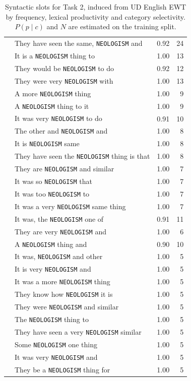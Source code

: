 \begin{table}[t]
\begin{tabular}{llrr}
 & They have seen the same, \texttt{NEOLOGISM} and & 0.92 & 24 \\
 & It is a \texttt{NEOLOGISM} thing to & 1.00 & 13 \\
 & They would be \texttt{NEOLOGISM} to do & 0.92 & 12 \\
 & They were very \texttt{NEOLOGISM} with & 1.00 & 13 \\
 & A more \texttt{NEOLOGISM} thing & 1.00 & 9 \\
 & A \texttt{NEOLOGISM} thing to it & 1.00 & 9 \\
 & It was very \texttt{NEOLOGISM} to do & 0.91 & 10 \\
 & The other and \texttt{NEOLOGISM} and & 1.00 & 8 \\
 & It is \texttt{NEOLOGISM} same & 1.00 & 8 \\
 & They have seen the \texttt{NEOLOGISM} thing is that & 1.00 & 8 \\
 & They are \texttt{NEOLOGISM} and similar & 1.00 & 7 \\
 & It was so \texttt{NEOLOGISM} that & 1.00 & 7 \\
 & It was too \texttt{NEOLOGISM} to & 1.00 & 7 \\
 & It was a very \texttt{NEOLOGISM} same thing & 1.00 & 7 \\
 & It was, the \texttt{NEOLOGISM} one of & 0.91 & 11 \\
 & They are very \texttt{NEOLOGISM} and & 1.00 & 6 \\
 & A \texttt{NEOLOGISM} thing and & 0.90 & 10 \\
 & It was, \texttt{NEOLOGISM} and other & 1.00 & 5 \\
 & It is very \texttt{NEOLOGISM} and & 1.00 & 5 \\
 & It was a more \texttt{NEOLOGISM} thing & 1.00 & 5 \\
 & They know how \texttt{NEOLOGISM} it is & 1.00 & 5 \\
 & They were \texttt{NEOLOGISM} and similar & 1.00 & 5 \\
 & The \texttt{NEOLOGISM} thing to & 1.00 & 5 \\
 & They have seen a very \texttt{NEOLOGISM} similar & 1.00 & 5 \\
 & Some \texttt{NEOLOGISM} one thing & 1.00 & 5 \\
 & It was very \texttt{NEOLOGISM} and & 1.00 & 5 \\
 & They be a \texttt{NEOLOGISM} thing for & 1.00 & 5 \\
\bottomrule
\end{tabular}
\caption{Syntactic slots for Task 2, induced from UD English EWT by frequency, lexical productivity and category selectivity. $P(p\mid c)$ and $N$ are estimated on the training split.}
\label{tab:slots}
\end{table}
